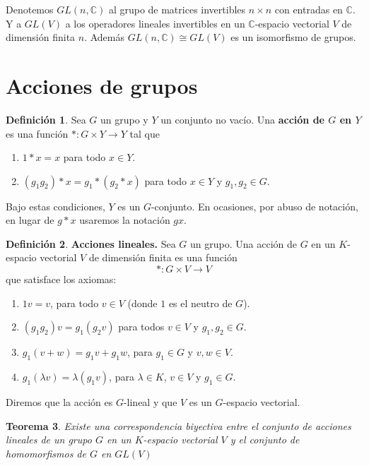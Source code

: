 \documentclass[12pt]{book}
\newtheorem{theorem}{Teorema}[section]
\theoremstyle{definition}
\newtheorem{definition}[theorem]{Definición}
\newcounter{in}
\newcounter{ini}
\begin{document}
{  Denotemos $GL(n,\mathbb{C})$ al grupo de matrices
  invertibles  $n \times n$ con entradas en $\mathbb{C}$.  
  Y a $GL(V)$ a los operadores lineales invertibles en un
  $\mathbb{C}$-espacio vectorial $V$ de dimensión finita $n$.
  Además $GL(n,\mathbb{C})\cong GL(V)$ es un isomorfismo de grupos.

\section{Acciones de grupos}

\begin{definition}
  Sea $G$ un grupo y $Y$ un conjunto no vacío. Una  \textbf{acción de $G$
  en $Y$} es una función $*:G \times Y \rightarrow Y$ tal que
\begin{enumerate}
\item $1*x=x$ para todo $x\in Y.$
\item $(g_{1}g_{2})*x=g_{1}*(g_{2}*x)$ para todo $x\in Y$ y $g_{1},g_{2}\in G.$
\end{enumerate}
   Bajo estas condiciones, $Y$ es un $G$-conjunto. En ocasiones, por
   abuso de notación, en lugar de $g*x$ usaremos la notación $gx.$
\end{definition}

\begin{definition}\textbf{Acciones lineales.}
  Sea $G$ un grupo. Una acción de $G$ en un $K$-espacio
  vectorial $V$ de dimensión finita es una función
 $$*:G\times V \rightarrow V $$
que satisface los axiomas:
\begin{enumerate}
\item $1v=v$, para todo $v\in V$ (donde $1$ es el neutro de $G$).
\item $(g_{1}g_{2})v=g_{1}(g_{2}v)$ para todos $v\in V$ y
  $g_{1},g_{2}\in G$.
\item $g_{1}(v+w)=g_{1}v+g_{1}w$, para $g_{1}\in G$ y $v,w \in V .$
\item $g_{1}(\lambda v)=\lambda(g_{1}v)$, para $\lambda \in K$,
  $v\in V$ y $g_{1}\in G.$
\end{enumerate}
Diremos que la acción es $G$-lineal y que $V$ es un $G$-espacio
vectorial.
\end{definition} 

\begin{theorem}
  Existe una correspondencia biyectiva entre el conjunto de acciones
  lineales de un grupo $G$ en un $K$-espacio vectorial $V$ y el conjunto
  de homomorfismos de $G$ en $GL(V)$
\end{theorem}

}
\end{document}
